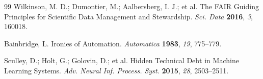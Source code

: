 \documentclass[11pt]{article}
\begin{document}
\begin{thebibliography}{99}
Wilkinson, M. D.; Dumontier, M.; Aalbersberg, I. J.; et al.
The FAIR Guiding Principles for Scientific Data Management and Stewardship.
\emph{Sci. Data} \textbf{2016}, \emph{3}, 160018.

Bainbridge, L.
Ironies of Automation.
\emph{Automatica} \textbf{1983}, \emph{19}, 775--779.

Sculley, D.; Holt, G.; Golovin, D.; et al.
Hidden Technical Debt in Machine Learning Systems.
\emph{Adv. Neural Inf. Process. Syst.} \textbf{2015}, \emph{28}, 2503--2511.

\end{thebibliography}
\end{document}
